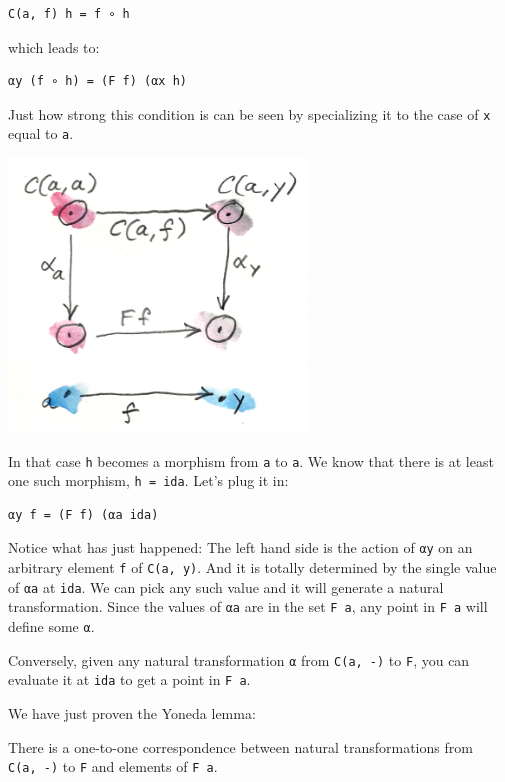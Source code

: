 \begin{verbatim}
C(a, f) h = f ∘ h
\end{verbatim}

which leads to:

\begin{verbatim}
αy (f ∘ h) = (F f) (αx h)
\end{verbatim}

Just how strong this condition is can be seen by specializing it to the
case of \texttt{x} equal to \texttt{a}.

\includegraphics[width=3.12500in]{images/yoneda2.png}

In that case \texttt{h} becomes a morphism from \texttt{a} to
\texttt{a}. We know that there is at least one such morphism,
\texttt{h\ =\ ida}. Let's plug it in:

\begin{verbatim}
αy f = (F f) (αa ida)
\end{verbatim}

Notice what has just happened: The left hand side is the action of
\texttt{αy} on an arbitrary element \texttt{f} of \texttt{C(a,\ y)}. And
it is totally determined by the single value of \texttt{αa} at
\texttt{ida}. We can pick any such value and it will generate a natural
transformation. Since the values of \texttt{αa} are in the set
\texttt{F\ a}, any point in \texttt{F\ a} will define some \texttt{α}.

Conversely, given any natural transformation \texttt{α} from
\texttt{C(a,\ -)} to \texttt{F}, you can evaluate it at \texttt{ida} to
get a point in \texttt{F\ a}.

We have just proven the Yoneda lemma:

There is a one-to-one correspondence between natural transformations
from \texttt{C(a,\ -)} to \texttt{F} and elements of \texttt{F\ a}.

